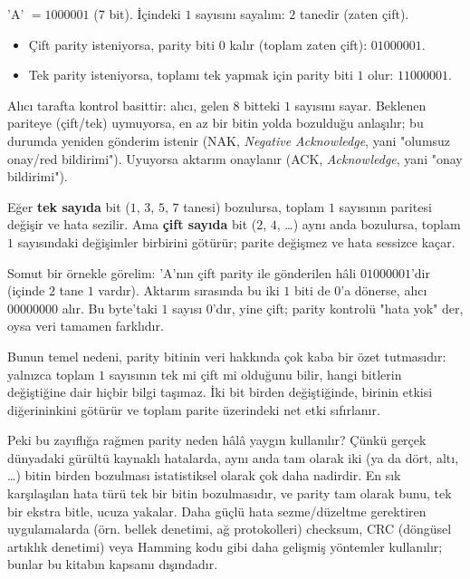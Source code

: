 \begin{ornek}
'A' $=1000001$ (7 bit). İçindeki $1$ sayısını sayalım: $2$ tanedir (zaten çift).
\begin{itemize}[nosep, leftmargin=*]
    \item Çift parity isteniyorsa, parity biti $0$ kalır (toplam zaten çift): $01000001$.
    \item Tek parity isteniyorsa, toplamı tek yapmak için parity biti $1$ olur:
    $11000001$.
\end{itemize}
\end{ornek}

Alıcı tarafta kontrol basittir: alıcı, gelen $8$ bitteki $1$ sayısını sayar. Beklenen
pariteye (çift/tek) uymuyorsa, en az bir bitin yolda bozulduğu anlaşılır; bu durumda
yeniden gönderim istenir (NAK, \emph{Negative Acknowledge}, yani "olumsuz onay/red
bildirimi"). Uyuyorsa aktarım onaylanır (ACK, \emph{Acknowledge}, yani "onay
bildirimi").

\begin{bilginot}
Eğer \textbf{tek sayıda} bit ($1$, $3$, $5$, $7$ tanesi) bozulursa, toplam $1$ sayısının
paritesi değişir ve hata sezilir. Ama \textbf{çift sayıda} bit ($2$, $4$, \ldots) aynı
anda bozulursa, toplam $1$ sayısındaki değişimler birbirini götürür; parite değişmez ve
hata sessizce kaçar.

Somut bir örnekle görelim: 'A'nın çift parity ile gönderilen hâli $01000001$'dir (içinde
$2$ tane $1$ vardır). Aktarım sırasında bu iki $1$ biti de $0$'a dönerse, alıcı
$00000000$ alır. Bu byte'taki $1$ sayısı $0$'dır, yine çift; parity kontrolü "hata yok"
der, oysa veri tamamen farklıdır.

Bunun temel nedeni, parity bitinin veri hakkında çok kaba bir özet tutmasıdır: yalnızca
toplam $1$ sayısının tek mi çift mi olduğunu bilir, hangi bitlerin değiştiğine dair hiçbir
bilgi taşımaz. İki bit birden değiştiğinde, birinin etkisi diğerininkini götürür ve
toplam parite üzerindeki net etki sıfırlanır.

Peki bu zayıflığa rağmen parity neden hâlâ yaygın kullanılır? Çünkü gerçek dünyadaki
gürültü kaynaklı hatalarda, aynı anda tam olarak iki (ya da dört, altı, \ldots) bitin
birden bozulması istatistiksel olarak çok daha nadirdir. En sık karşılaşılan hata türü
tek bir bitin bozulmasıdır, ve parity tam olarak bunu, tek bir ekstra bitle, ucuza yakalar.
Daha güçlü hata sezme/düzeltme gerektiren uygulamalarda (örn. bellek denetimi, ağ
protokolleri) checksum, CRC (döngüsel artıklık denetimi) veya Hamming kodu gibi daha
gelişmiş yöntemler kullanılır; bunlar bu kitabın kapsamı dışındadır.
\end{bilginot}

